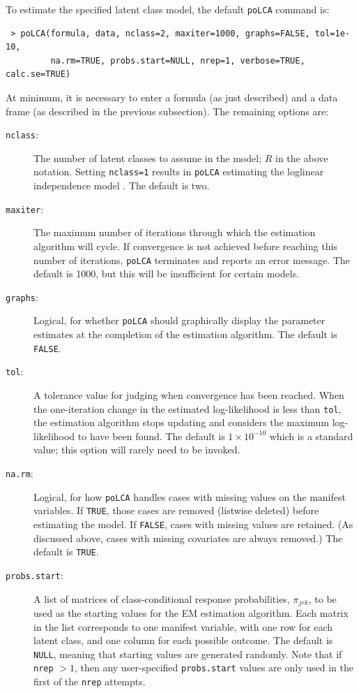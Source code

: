 \documentclass[letterpaper,12pt]{article}
\begin{document}
To estimate the specified latent class model, the default \texttt{poLCA} command is:
\begin{verbatim}
 > poLCA(formula, data, nclass=2, maxiter=1000, graphs=FALSE, tol=1e-10,
         na.rm=TRUE, probs.start=NULL, nrep=1, verbose=TRUE, calc.se=TRUE)
\end{verbatim}
At minimum, it is necessary to enter a formula (as just described) and a data frame (as described in the previous subsection). The remaining options are:
\begin{description}
    \item [\texttt{nclass}:] The number of latent classes to assume in the model; $R$ in the above notation. Setting \texttt{nclass=1} results in \texttt{poLCA} estimating the loglinear independence model \citep{Goodman1970}. The default is two.
    \item [\texttt{maxiter}:] The maximum number of iterations through which the estimation algorithm will cycle.  If convergence is not achieved before reaching this number of iterations, \texttt{poLCA} terminates and reports an error message.  The default is 1000, but this will be insufficient for certain models.
    \item [\texttt{graphs}:] Logical, for whether \texttt{poLCA} should graphically display the parameter estimates at the completion of the estimation algorithm. The default is \texttt{FALSE}.
    \item [\texttt{tol}:] A tolerance value for judging when convergence has been reached.  When the one-iteration change in the estimated log-likelihood is less than \texttt{tol}, the estimation algorithm stops updating and considers the maximum log-likelihood to have been found. The default is $1 \times 10^{-10}$ which is a standard value; this option will rarely need to be invoked.
    \item [\texttt{na.rm}:] Logical, for how \texttt{poLCA} handles cases with missing values on the manifest variables.  If \texttt{TRUE}, those cases are removed (listwise deleted) before estimating the model. If \texttt{FALSE}, cases with missing values are retained.  (As discussed above, cases with missing covariates are always removed.) The default is \texttt{TRUE}.
    \item [\texttt{probs.start}:] A list of matrices of class-conditional response probabilities, $\pi_{jrk}$, to be used as the starting values for the EM estimation algorithm.  Each matrix in the list corresponds to one manifest variable, with one row for each latent class, and one column for each possible outcome.  The default is \texttt{NULL}, meaning that starting values are generated randomly.  Note that if \texttt{nrep} $>1$, then any user-specified \texttt{probs.start} values are only used in the first of the \texttt{nrep} attempts.

\end{description}
\end{document}
